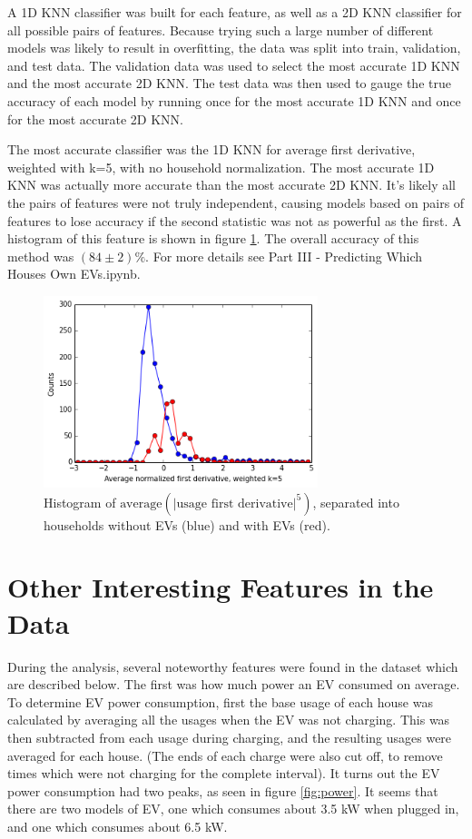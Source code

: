 \documentclass[12pt]{extarticle}
\begin{document}
A 1D KNN classifier was built for each feature, as well as a 2D KNN classifier for all possible pairs of features.
Because trying such a large number of different models was likely to result in overfitting, the data was split into train, validation, and test data.
The validation data was used to select the most accurate 1D KNN and the most accurate 2D KNN.
The test data was then used to gauge the true accuracy of each model by running once for the most accurate 1D KNN and once for the most accurate 2D KNN.

The most accurate classifier was the 1D KNN for average first derivative, weighted with k=5, with no household normalization.
The most accurate 1D KNN was actually more accurate than the most accurate 2D KNN.
It's likely all the pairs of features were not truly independent, causing models based on pairs of features to lose accuracy if the second statistic was not as powerful as the first.
A histogram of this feature is shown in figure \ref{fig:knn}.
The overall accuracy of this method was $(84 \pm 2)\%$.
For more details see Part III - Predicting Which Houses Own EVs.ipynb.

\begin{figure}
\centering
\includegraphics[width=8cm]{knn}
\caption{Histogram of \textbf{$\mbox{average}(|\mbox{usage first derivative}|^5)$}, separated into households without EVs (blue) and with EVs (red).}
\label{fig:knn}
\end{figure}

\section{Other Interesting Features in the Data}
During the analysis, several noteworthy features were found in the dataset which are described below.
The first was how much power an EV consumed on average.
To determine EV power consumption, first the base usage of each house was calculated by averaging all the usages when the EV was not charging.
This was then subtracted from each usage during charging, and the resulting usages were averaged for each house.
(The ends of each charge were also cut off, to remove times which were not charging for the complete interval).
It turns out the EV power consumption had two peaks, as seen in figure \ref{fig:power}.
It seems that there are two models of EV, one which consumes about 3.5 kW when plugged in, and one which consumes about 6.5 kW.
\end{document}
